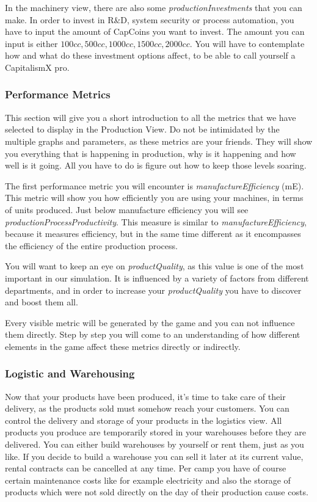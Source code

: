 In the machinery view, there are also some \textit{productionInvestments} that you can make. In order to invest in R\&D, system security or process automation, you have to input the amount of CapCoins you want to
invest. The amount you can input is either $100cc,500cc,1000cc,1500cc,2000cc$. You will have to contemplate how and what do these investment options affect, to be able to call yourself a CapitalismX pro.

\subsubsection{Performance Metrics}
This section will give you a short introduction to all the metrics that we have selected to display in the Production View. Do not be intimidated by the multiple graphs and parameters, as these metrics are your friends. They will show you everything that is happening in production, why is it happening and how well is it going. All you have to do is figure out how to keep those levels soaring. 

The first performance metric you will encounter is \textit{manufactureEfficiency} (\gls{mE}). This metric will show you how efficiently you are using your machines, in terms of units produced.
Just below manufacture efficiency you will see \textit{productionProcessProductivity}. This measure is similar to \textit{manufactureEfficiency}, because it measures efficiency, but in the same time different as it encompasses the efficiency of the entire production process. 

You will want to keep an eye on \textit{productQuality}, as this value is one of the most important in our simulation. It is influenced by a variety of factors from different departments, and in order to increase your \textit{productQuality} you have to discover and  boost them all.

Every visible metric will be generated by the game and you can not influence them directly. Step by step you will come to an understanding of how different elements in the game affect these metrics directly or indirectly.

\subsubsection{Logistic and Warehousing}
Now that your products have been produced, it's time to take care of their delivery, as the products sold must somehow reach your customers. You can control the delivery and storage of your products in the logistics view. 
All products you produce are temporarily stored in your warehouses before they are delivered. You can either build warehouses by yourself or rent them, just as you like. If you decide to build a warehouse you can sell it later at its current value, rental contracts can be cancelled at any time. Per camp you have of course certain maintenance costs like for example electricity and also the storage of products which were not sold directly on the day of their production cause costs.

